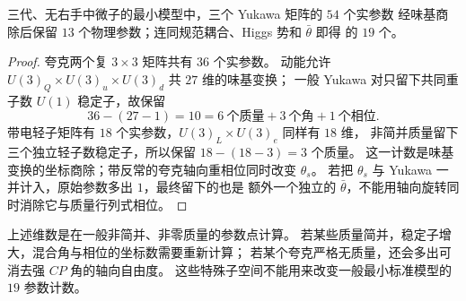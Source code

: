 \begin{proposition}
三代、无右手中微子的最小模型中，三个 Yukawa 矩阵的 $54$ 个实参数
经味基商除后保留 $13$ 个物理参数；连同规范耦合、Higgs 势和 $\bar\theta$
即得 的 $19$ 个。
\end{proposition}
\begin{proof}
夸克两个复 $3\times3$ 矩阵共有 $36$ 个实参数。
动能允许 $U(3)_Q\times U(3)_u\times U(3)_d$ 共 $27$ 维的味基变换；
一般 Yukawa 对只留下共同重子数 $U(1)$ 稳定子，故保留
\begin{equation*}
36-(27-1)=10=6\ \text{个质量}+3\ \text{个角}+1\ \text{个相位}.
\end{equation*}
带电轻子矩阵有 $18$ 个实参数，$U(3)_L\times U(3)_e$ 同样有 $18$ 维，
非简并质量留下三个独立轻子数稳定子，所以保留 $18-(18-3)=3$ 个质量。
这一计数是味基变换的坐标商除；带反常的夸克轴向重相位同时改变 $\theta_s$。
若把 $\theta_s$ 与 Yukawa 一并计入，原始参数多出 $1$，最终留下的也是
额外一个独立的 $\bar\theta$，不能用轴向旋转同时消除它与质量行列式相位。
\end{proof}

\begin{remark}[质量简并和无质量极限]
上述维数是在一般非简并、非零质量的参数点计算。
若某些质量简并，稳定子增大，混合角与相位的坐标数需要重新计算；
若某个夸克严格无质量，还会多出可消去强 $CP$ 角的轴向自由度。
这些特殊子空间不能用来改变一般最小标准模型的 $19$ 参数计数。
\end{remark}

